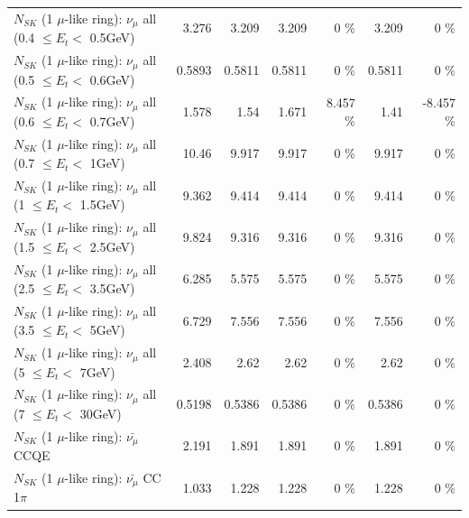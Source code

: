 \begin{table}
\begin{tabular}{| l | r | r | r  r | r  r |}
       $N_{SK}$ (1 $\mu$-like ring): $\nu_{\mu}$ all (0.4 $\leq E_{t} <$ 0.5GeV) &           3.276 &           3.209 &           3.209 &        0 \%  &           3.209 &        0 \%  \\ 
       $N_{SK}$ (1 $\mu$-like ring): $\nu_{\mu}$ all (0.5 $\leq E_{t} <$ 0.6GeV) &          0.5893 &          0.5811 &          0.5811 &        0 \%  &          0.5811 &        0 \%  \\ 
       $N_{SK}$ (1 $\mu$-like ring): $\nu_{\mu}$ all (0.6 $\leq E_{t} <$ 0.7GeV) &           1.578 &            1.54 &           1.671 &    8.457 \%  &            1.41 &   -8.457 \%  \\ 
         $N_{SK}$ (1 $\mu$-like ring): $\nu_{\mu}$ all (0.7 $\leq E_{t} <$ 1GeV) &           10.46 &           9.917 &           9.917 &        0 \%  &           9.917 &        0 \%  \\ 
         $N_{SK}$ (1 $\mu$-like ring): $\nu_{\mu}$ all (1 $\leq E_{t} <$ 1.5GeV) &           9.362 &           9.414 &           9.414 &        0 \%  &           9.414 &        0 \%  \\ 
       $N_{SK}$ (1 $\mu$-like ring): $\nu_{\mu}$ all (1.5 $\leq E_{t} <$ 2.5GeV) &           9.824 &           9.316 &           9.316 &        0 \%  &           9.316 &        0 \%  \\ 
       $N_{SK}$ (1 $\mu$-like ring): $\nu_{\mu}$ all (2.5 $\leq E_{t} <$ 3.5GeV) &           6.285 &           5.575 &           5.575 &        0 \%  &           5.575 &        0 \%  \\ 
         $N_{SK}$ (1 $\mu$-like ring): $\nu_{\mu}$ all (3.5 $\leq E_{t} <$ 5GeV) &           6.729 &           7.556 &           7.556 &        0 \%  &           7.556 &        0 \%  \\ 
           $N_{SK}$ (1 $\mu$-like ring): $\nu_{\mu}$ all (5 $\leq E_{t} <$ 7GeV) &           2.408 &            2.62 &            2.62 &        0 \%  &            2.62 &        0 \%  \\ 
          $N_{SK}$ (1 $\mu$-like ring): $\nu_{\mu}$ all (7 $\leq E_{t} <$ 30GeV) &          0.5198 &          0.5386 &          0.5386 &        0 \%  &          0.5386 &        0 \%  \\ 
\hline
\hline
\hline
                              $N_{SK}$ (1 $\mu$-like ring): $\bar{\nu_\mu}$ CCQE &           2.191 &           1.891 &           1.891 &        0 \%  &           1.891 &        0 \%  \\ 
                         $N_{SK}$ (1 $\mu$-like ring): $\bar{\nu_\mu}$ CC 1$\pi$ &           1.033 &           1.228 &           1.228 &        0 \%  &           1.228 &        0 \%  \\ 

\end{tabular}
\end{table}
